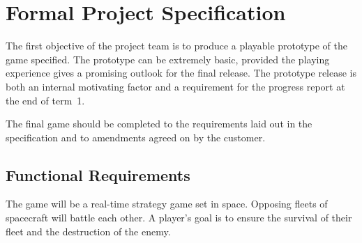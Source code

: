 \section{Formal Project Specification}
\label{sec:specv2}


The first objective of the project team is to produce a playable prototype of the game specified. 
The prototype can be extremely basic, provided the playing experience gives a promising outlook for the final release. The prototype release is both an internal motivating factor and a requirement for the progress report at the end of term~1.

The final game should be completed to the requirements laid out in the specification and to amendments agreed on by the customer.

\subsection{Functional Requirements}


The game will be a real-time strategy game set in space. Opposing fleets of spacecraft
will battle each other. A player's goal is to ensure the survival of their fleet and the destruction
of the enemy.

